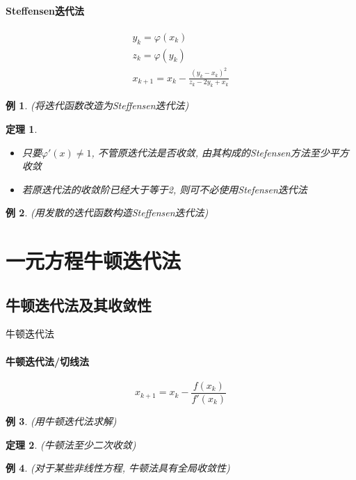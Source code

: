 \documentclass[twoside]{article}
\newtheorem{theorem}{定理}[section]
\newtheorem{eg}{例}[section]
\begin{document}
\paragraph{Steffensen迭代法}
\begin{equation}
  \begin{aligned}
    y_k = \varphi(x_k)\\
    z_k = \varphi(y_k)\\
    x_{k+1} = x_k - \frac{{(y_k-x_k)}^2}{z_k-2y_k+x_k}
  \end{aligned}
\end{equation}
\begin{eg}
  (将迭代函数改造为Steffensen迭代法)
\end{eg}
\begin{theorem}
  \begin{itemize}
    \item 只要$\varphi'(x)\ne1$, 不管原迭代法是否收敛, 由其构成的Stefensen方法至少平方收敛
    \item 若原迭代法的收敛阶已经大于等于2, 则可不必使用Stefensen迭代法
  \end{itemize}
\end{theorem}
\begin{eg}
  (用发散的迭代函数构造Steffensen迭代法)
\end{eg}

\section{一元方程牛顿迭代法}
\subsection{牛顿迭代法及其收敛性}
牛顿迭代法
\paragraph{牛顿迭代法/切线法}
\begin{equation}
  x_{k+1} = x_k - \frac{f(x_k)}{f'(x_k)}
\end{equation}
\begin{eg}
  (用牛顿迭代法求解)
\end{eg}
\begin{theorem}
  (牛顿法至少二次收敛)
\end{theorem}
\begin{eg}
  (对于某些非线性方程, 牛顿法具有全局收敛性)
\end{eg}
\end{document}

